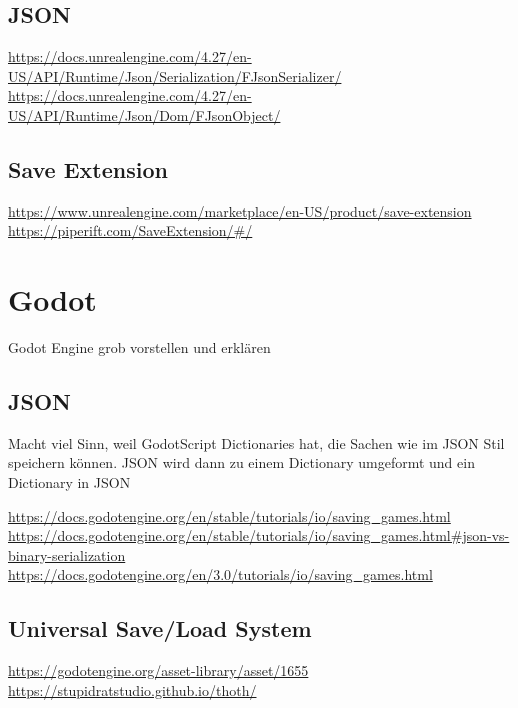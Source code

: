\subsection{JSON}
\url{https://docs.unrealengine.com/4.27/en-US/API/Runtime/Json/Serialization/FJsonSerializer/}\\
\url{https://docs.unrealengine.com/4.27/en-US/API/Runtime/Json/Dom/FJsonObject/}

\subsection{Save Extension}
\url{https://www.unrealengine.com/marketplace/en-US/product/save-extension}\\
\url{https://piperift.com/SaveExtension/#/}


\section{Godot}
Godot Engine grob vorstellen und erklären

\subsection{JSON}
Macht viel Sinn, weil GodotScript Dictionaries hat, die Sachen wie im JSON Stil speichern 
können. JSON wird dann zu einem Dictionary umgeformt und ein Dictionary in JSON

\url{https://docs.godotengine.org/en/stable/tutorials/io/saving_games.html}\\
\url{https://docs.godotengine.org/en/stable/tutorials/io/saving_games.html#json-vs-binary-serialization}\\
\url{https://docs.godotengine.org/en/3.0/tutorials/io/saving_games.html}

\subsection{Universal Save/Load System}
\url{https://godotengine.org/asset-library/asset/1655}\\
\url{https://stupidratstudio.github.io/thoth/}
